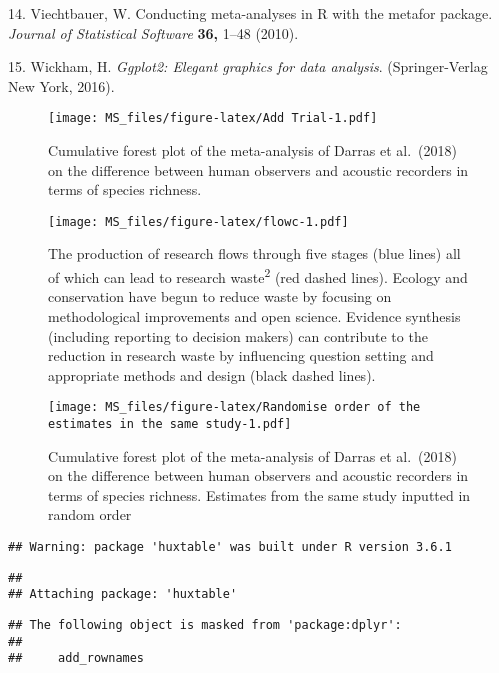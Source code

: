 \documentclass[]{article}
\begin{document}
\leavevmode\hypertarget{ref-metafor}{}%
14. Viechtbauer, W. Conducting meta-analyses in R with the metafor
package. \emph{Journal of Statistical Software} \textbf{36,} 1--48
(2010).

\leavevmode\hypertarget{ref-ggplot2}{}%
15. Wickham, H. \emph{Ggplot2: Elegant graphics for data analysis}.
(Springer-Verlag New York, 2016).

\newpage

\begin{figure}
\centering
\texttt{[image: MS\_files/figure-latex/Add Trial-1.pdf]}
\caption{Cumulative forest plot of the meta-analysis of Darras et
al.~(2018) on the difference between human observers and acoustic
recorders in terms of species richness.\label{forest}}
\end{figure}

\begin{figure}
\centering
\texttt{[image: MS\_files/figure-latex/flowc-1.pdf]}
\caption{The production of research flows through five stages (blue
lines) all of which can lead to research waste\textsuperscript{2} (red
dashed lines). Ecology and conservation have begun to reduce waste by
focusing on methodological improvements and open science. Evidence
synthesis (including reporting to decision makers) can contribute to the
reduction in research waste by influencing question setting and
appropriate methods and design (black dashed lines).\label{flow}}
\end{figure}

\begin{figure}
\centering
\texttt{[image: MS\_files/figure-latex/Randomise order of the estimates in the same study-1.pdf]}
\caption{Cumulative forest plot of the meta-analysis of Darras et
al.~(2018) on the difference between human observers and acoustic
recorders in terms of species richness. Estimates from the same study
inputted in random order\label{forestX}}
\end{figure}

\begin{verbatim}
## Warning: package 'huxtable' was built under R version 3.6.1
\end{verbatim}

\begin{verbatim}
## 
## Attaching package: 'huxtable'
\end{verbatim}

\begin{verbatim}
## The following object is masked from 'package:dplyr':
## 
##     add_rownames
\end{verbatim}
\end{document}
